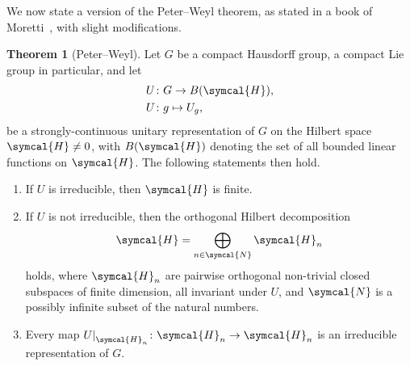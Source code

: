 \documentclass[12pt, a4 paper]{article}
\theoremstyle{definition}
\newtheorem{thm}{Theorem}
\newcommand{\hilbert}{\symcal{H}}
\newcommand\restr[2]{{%
        \left.\kern-\nulldelimiterspace %
        #1 %
        \littletaller %
        \right|_{#2} %
    }}
\newcommand{\littletaller}{\mathchoice{\vphantom{\big|}}{}{}{}}
\begin{document}
    We now state a version of the Peter--Weyl theorem, as stated in a book of Moretti~\cite[p.~287]{MorettiFundamental}, with slight modifications.

    \begin{thm}[Peter--Weyl]
        Let \(G\) be a compact Hausdorff group, a compact Lie group in particular, and let
        \begin{align*}
            U &\colon G \rightarrow B(\hilbert),\\
            U &\colon g \mapsto U_g,
        \end{align*}
        be a strongly-continuous unitary representation of $G$ on the Hilbert space $\hilbert \neq 0$, with $B(\hilbert)$ denoting the set of all bounded linear functions on $\hilbert$. The following statements then hold.
        \begin{enumerate}
            \item If \(U\) is irreducible, then \(\hilbert\) is finite.
            \item If \(U\) is not irreducible, then the orthogonal Hilbert decomposition
            \[
                \hilbert = \bigoplus_{n\in \symcal{N}} \hilbert_n
            \]
            holds, where \(\hilbert_n\) are pairwise orthogonal non-trivial closed subspaces of finite dimension, all invariant under \(U\), and \(\symcal{N}\) is a possibly infinite subset of the natural numbers.
            \item Every map \(\restr{U}{\hilbert_n} \colon \hilbert_n \rightarrow \hilbert_n\) is an irreducible representation of \(G\).
        \end{enumerate}
    \end{thm}
\end{document}
